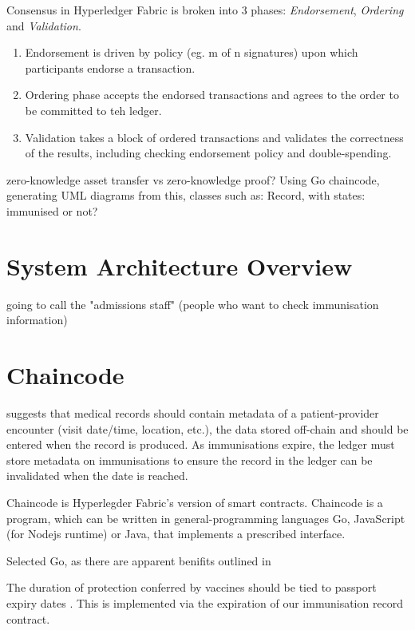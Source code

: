 \documentclass{report}
\begin{document}
\begin{flushleft}
Consensus in Hyperledger Fabric is broken into 3 phases: \emph{Endorsement}, \emph{Ordering} and \emph{Validation}.
\begin{enumerate}
  \item Endorsement is driven by policy (eg. m of n signatures) upon which participants endorse a transaction. 
  \item Ordering phase accepts the endorsed transactions and agrees to the order to be committed to teh ledger.
  \item Validation takes a block of ordered transactions and validates the correctness of the results, including checking endorsement policy and double-spending.
\end{enumerate}
zero-knowledge asset transfer vs zero-knowledge proof? \linebreak[1]
Using Go chaincode, generating UML diagrams from this, classes such as: Record, with states: immunised or not?

\section{System Architecture Overview}

going to call the "admissions staff" (people who want to check immunisation information) 



\section{Chaincode}

\cite{alexaki_blockchain-based_2018} suggests that medical records should contain metadata of a patient-provider encounter (visit date/time, location, etc.), 
the data stored off-chain and should be entered when the record is produced. As immunisations expire, the ledger must store metadata on immunisations to ensure the record in the ledger can be invalidated when the date is reached.

Chaincode is Hyperlegder Fabric's version of smart contracts. Chaincode is a program, which can be written in general-programming languages Go, JavaScript (for Nodejs runtime) or Java, that implements a prescribed interface.

Selected Go, as there are apparent benifits outlined in \cite{foschini_hyperledger_2020}

The duration of protection conferred by vaccines should
be tied to passport expiry dates \cite{dye_covid-19_2021}.
This is implemented via the expiration of our immunisation record contract.


\end{flushleft}
\end{document}
